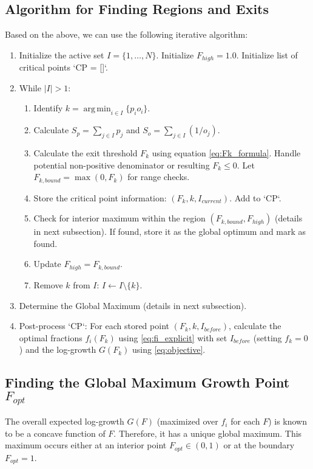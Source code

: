 \documentclass[11pt, letterpaper]{article}
\theoremstyle{definition}
\DeclareMathOperator*{\argmin}{arg\,min}
\begin{document}
\subsection{Algorithm for Finding Regions and Exits}

Based on the above, we can use the following iterative algorithm:
\begin{enumerate}
    \item Initialize the active set $I = \{1, \dots, N\}$. Initialize $F_{high} = 1.0$. Initialize list of critical points `CP = []`.
    \item While $|I| > 1$:
        \begin{enumerate}
            \item Identify $k = \argmin_{i \in I} \{p_i o_i\}$.
            \item Calculate $S_p = \sum_{j \in I} p_j$ and $S_o = \sum_{j \in I} (1/o_j)$.
            \item Calculate the exit threshold $F_k$ using equation \eqref{eq:Fk_formula}. Handle potential non-positive denominator or resulting $F_k \le 0$. Let $F_{k,bound} = \max(0, F_k)$ for range checks.
            \item Store the critical point information: $(F_k, k, I_{current})$. Add to `CP`.
            \item Check for interior maximum within the region $(F_{k,bound}, F_{high})$ (details in next subsection). If found, store it as the global optimum and mark as found.
            \item Update $F_{high} = F_{k,bound}$.
            \item Remove $k$ from $I$: $I \leftarrow I \setminus \{k\}$.
        \end{enumerate}
    \item Determine the Global Maximum (details in next subsection).
    \item Post-process `CP`: For each stored point $(F_k, k, I_{before})$, calculate the optimal fractions $f_i(F_k)$ using \eqref{eq:fi_explicit} with set $I_{before}$ (setting $f_k=0$) and the log-growth $G(F_k)$ using \eqref{eq:objective}.
\end{enumerate}

\subsection{Finding the Global Maximum Growth Point \texorpdfstring{$F_{opt}$}{Fopt}}

The overall expected log-growth $G(F)$ (maximized over $f_i$ for each $F$) is known to be a concave function of $F$. Therefore, it has a unique global maximum. This maximum occurs either at an interior point $F_{opt} \in (0, 1)$ or at the boundary $F_{opt}=1$.
\end{document}
